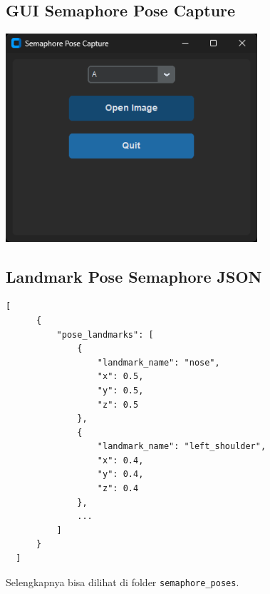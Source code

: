 \documentclass[a4paper,12pt]{article}
\begin{document}
\subsection{GUI Semaphore Pose Capture}
\begin{center}
    \includegraphics[width=0.7\textwidth]{gui_pose_capture.png}
\end{center}

\subsection{Landmark Pose Semaphore JSON}
\begin{lstlisting}[caption={Contoh File JSON Landmark Pose Semaphore}]
  [
      {
          "pose_landmarks": [
              {
                  "landmark_name": "nose",
                  "x": 0.5,
                  "y": 0.5,
                  "z": 0.5
              },
              {
                  "landmark_name": "left_shoulder",
                  "x": 0.4,
                  "y": 0.4,
                  "z": 0.4
              },
              ...
          ]
      }
  ]
\end{lstlisting}
Selengkapnya bisa dilihat di folder \texttt{semaphore\_poses}.
\end{document}
